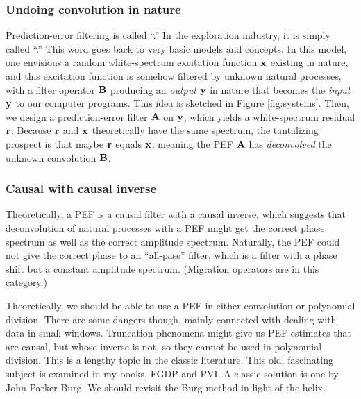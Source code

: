 \subsubsection{Undoing convolution in nature}
Prediction-error filtering is called
``.''
In the exploration industry, it is simply called ``.''
This word goes back to very basic models and concepts.
In this model, one envisions
a random white-spectrum excitation function $\bold x$
existing in nature, and this excitation function
is somehow filtered by unknown natural processes,
with a filter operator $\bold B$
producing an {\it output} $\bold y$ in nature
that becomes the {\it input} $\bold y$
to our computer programs.
This idea is sketched in Figure \ref{fig:systems}.
Then, we design a prediction-error filter $\bold A$ on $\bold y$,
which yields a white-spectrum residual $\bold r$.
Because $\bold r$ and $\bold x$ theoretically have the same spectrum,
the tantalizing prospect is that maybe $\bold r$ equals $\bold x$,
meaning the PEF $\bold A$ has {\it deconvolved}
the unknown convolution $\bold B$.

\subsubsection{Causal with causal inverse}
Theoretically, a PEF is a causal filter with a causal inverse,
which suggests that deconvolution
of natural processes with a PEF might get the correct phase spectrum
as well as the correct amplitude spectrum.
Naturally, the PEF could not give the correct phase to an ``all-pass'' filter, which
is a filter with a phase shift but a constant amplitude spectrum.
(Migration operators are in this category.)

\par
Theoretically, we should be able to use a PEF
in either convolution or polynomial division.
There are some dangers though,
mainly connected with dealing with data in small windows.
Truncation phenomena might give us PEF estimates
that are causal, but whose inverse is not,
so they cannot be used in polynomial division.
This is a lengthy topic in the classic literature.
This old, fascinating subject is examined in my books, FGDP and PVI.
A classic solution is one by John Parker Burg.
We should revisit the Burg method in light of the helix.

